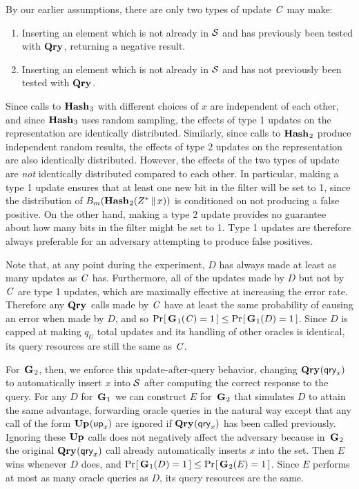 By our earlier assumptions, there are only two types of update $\mathit{C}$ may make:
%
\begin{enumerate}
  \item Inserting an element which is not already in $\mathcal{S}$ and has previously been tested with $\textup{\textbf{Qry}}\hspace{0.5pt}$, returning a negative result.
  \item Inserting an element which is not already in $\mathcal{S}$ and has not previously been tested with $\textup{\textbf{Qry}}\hspace{0.5pt}$.
\end{enumerate}
Since calls to $\textup{\textbf{Hash}}\hspace{0.5pt}_3$ with different choices of $x$ are independent of each
other, and since $\textup{\textbf{Hash}}\hspace{0.5pt}_3$ uses random sampling, the effects of type 1 updates
on the representation are identically distributed. Similarly, since calls to
$\textup{\textbf{Hash}}\hspace{0.5pt}_2$ produce independent random results, the effects of type 2 updates on
the representation are also identically distributed. However, the effects of the
two types of update are \emph{not} identically distributed compared to each
other. In particular, making a type 1 update ensures that at least one new bit
in the filter will be set to 1, since the distribution of
${B}_m(\textup{\textbf{Hash}}\hspace{0.5pt}_2(Z^* \, \| \, x))$ is conditioned on not producing a false
positive. On the other hand, making a type 2 update provides no guarantee about
how many bits in the filter might be set to 1. Type 1 updates are therefore
always preferable for an adversary attempting to produce false positives.

Note that, at any point during the experiment, $D$ has always made at least as
many updates as $\mathit{C}$ has. Furthermore, all of the updates made by $D$ but not
by $\mathit{C}$ are type 1 updates, which are maximally effective at increasing the
error rate. Therefore any $\textup{\textbf{Qry}}\hspace{0.5pt}$ calls made by $\mathit{C}$ have at least the same
probability of causing an error when made by $D$, and so
$\Pr\hspace{-1pt}\left[\,\textup{\textbf{G}}\hspace{0.5pt}_1(\mathit{C}) = 1\,\right] \le \Pr\hspace{-1pt}\left[\,\textup{\textbf{G}}\hspace{0.5pt}_1(D) = 1\,\right]$. Since $D$ is
capped at making $q_U$ total updates and its handling of other oracles is
identical, its query resources are still the same as $\mathit{C}$.

For~$\textup{\textbf{G}}\hspace{0.5pt}_2$, then, we enforce this update-after-query behavior, changing
$\textup{\textbf{Qry}}\hspace{0.5pt}(\mathsf{qry}_x)$ to
automatically insert $x$ into $\mathcal{S}$ after computing the correct response to the
query. For any $D$ for~$\textup{\textbf{G}}\hspace{0.5pt}_1$ we can construct $E$ for~$\textup{\textbf{G}}\hspace{0.5pt}_2$ that
simulates $D$ to attain the same advantage, forwarding oracle queries in the
natural way except that any call of the form $\textup{\textbf{Up}}\hspace{0.5pt}(\mathsf{up}_x)$ are ignored if $\textup{\textbf{Qry}}\hspace{0.5pt}(\mathsf{qry}_x)$
has been called previously. Ignoring these $\textup{\textbf{Up}}\hspace{0.5pt}$ calls does not negatively
affect the adversary because in~$\textup{\textbf{G}}\hspace{0.5pt}_2$ the original $\textup{\textbf{Qry}}\hspace{0.5pt}(\mathsf{qry}_x)$ call
already automatically inserts $x$ into the set. Then $E$ wins whenever $D$ does, and
$\Pr\hspace{-1pt}\left[\,\textup{\textbf{G}}\hspace{0.5pt}_1(D) = 1\,\right] \le \Pr\hspace{-1pt}\left[\,\textup{\textbf{G}}\hspace{0.5pt}_2(E) = 1\,\right]$. Since $E$ performs at most as
many oracle queries as $D$, its query resources are the same.


